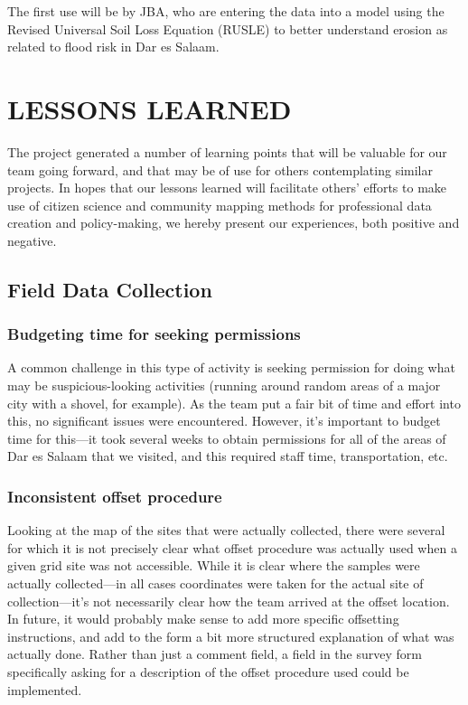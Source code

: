\documentclass[a4paper,12pt,twoside]{article}
\begin{document}
The first use will be by JBA, who are entering the data into a model using the Revised Universal Soil Loss Equation (RUSLE) to better understand erosion as related to flood risk in Dar es Salaam.

\newpage
\color{RHblue}
\hypertarget{lessonslearned}{}
\section{LESSONS LEARNED}
\label{lessonslearned}
\color{RHgrey}
The project generated a number of learning points that will be valuable for our team going forward, and that may be of use for others contemplating similar projects. In hopes that our lessons learned will facilitate others' efforts to make use of citizen science and community mapping methods for professional data creation and policy-making, we hereby present our experiences, both positive and negative.

\color{RHblue}
\subsection{Field Data Collection}
\label{fielddatacollection}

\subsubsection{Budgeting time for seeking permissions}

\color{RHgrey}
A common challenge in this type of activity is seeking permission for doing what may be suspicious-looking activities (running around random areas of a major city with a shovel, for example). As the team put a fair bit of time and effort into this, no significant issues were encountered. However, it's important to budget time for this---it took several weeks to obtain permissions for all of the areas of Dar es Salaam that we visited, and this required staff time, transportation, etc.

\color{RHblue}
\subsubsection{Inconsistent offset procedure}
\color{RHgrey}
Looking at the map of the sites that were actually collected, there were several for which it is not precisely clear what offset procedure was actually used when a given grid site was not accessible. While it is clear where the samples were actually collected---in all cases coordinates were taken for the actual site of collection---it's not necessarily clear how the team arrived at the offset location. In future, it would probably make sense to add more specific offsetting instructions, and add to the form a bit more structured explanation of what was actually done. Rather than just a comment field, a field in the survey form specifically asking for a description of the offset procedure used could be implemented.
\end{document}
